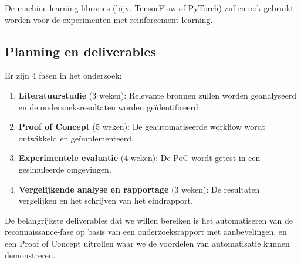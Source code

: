De machine learning libraries (bijv. TensorFlow of PyTorch) zullen ook gebruikt worden voor de experimenten met reinforcement learning.

\subsection{Planning en deliverables}
Er zijn 4 fasen in het onderzoek:
\begin{enumerate}
    \item \textbf{Literatuurstudie} (3 weken): Relevante bronnen zullen worden geanalyseerd en de onderzoeksresultaten worden geïdentificeerd.
    \item \textbf{Proof of Concept} (5 weken): De geautomatiseerde workflow wordt ontwikkeld en geïmplementeerd.
    \item \textbf{Experimentele evaluatie} (4 weken): De PoC wordt getest in een gesimuleerde omgevingen.
    \item \textbf{Vergelijkende analyse en rapportage} (3 weken): De resultaten vergelijken en het schrijven van het eindrapport.
\end{enumerate}

De belangrijkste deliverables dat we willen bereiken is het automatiseren van de reconnaissance-fase op
basis van een onderzoeksrapport met aanbevelingen, en een Proof of Concept uitrollen waar we de voordelen
van automatisatie kunnen demonstreren.




